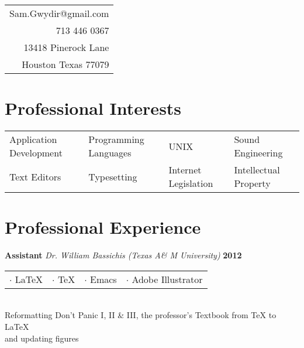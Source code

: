 \documentclass[margin,line]{res}
\begin{document}
\hfill
\vspace*{-.45in}
\begin{tabular}{r} 
  Sam.Gwydir@gmail.com\\
  713 446 0367\\            
  13418 Pinerock Lane\\
  Houston Texas 77079 
\end{tabular}

\vspace*{.1in}
{\color{WildStrawberry}
  \begin{resume}
    \color{black}
    
    {\color{WildStrawberry}
      \section{\sc Professional Interests}}
    \hspace{-.14in}
    \vspace{-.10in}
    \begin{tabular}{l l l l}
      Application Development & Programming Languages & UNIX & Sound Engineering \\
      Text Editors & Typesetting &  Internet Legislation & Intellectual Property 
    \end{tabular}

    {\color{WildStrawberry}
      \section{\sc Professional Experience}}
    {\bf Assistant} {\em Dr. William Bassichis (Texas A\& M University)} \hfill {\bf 2012} \ 
    \\
    \begin{tabular}{l l l l}
      $\cdot$ \LaTeX{} & $\cdot$ \TeX{} & $\cdot$ Emacs & $\cdot$ Adobe Illustrator
    \end{tabular}
    \\
    \hspace*{.14pt} 
    Reformatting Don't Panic I, II \& III, the professor's Textbook
    from \TeX{} to \LaTeX{} \\ and updating figures

    


\end{resume}}
\end{document}
